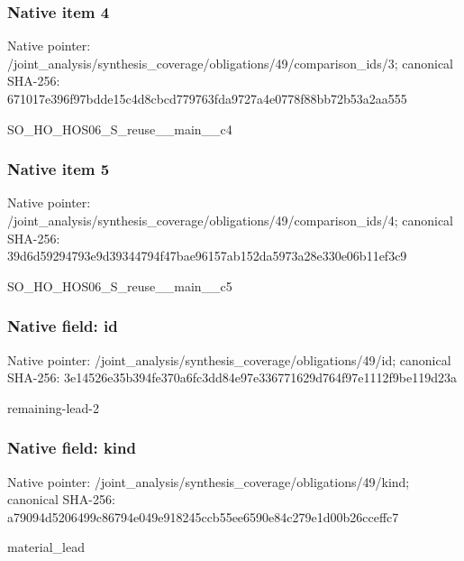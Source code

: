 \documentclass[10pt,a4paper]{article}
\begin{document}
\subsubsection{Native item 4}
Native pointer: /joint\_\allowbreak{}analysis/synthesis\_\allowbreak{}coverage/obligations/49/comparison\_\allowbreak{}ids/3; canonical SHA-256: 671017e396f97bdde15c4d8cbcd779763fda9727a4e0778f88bb72b53a2aa555

\begingroup\raggedright\sloppy SO\_\allowbreak{}HO\_\allowbreak{}HOS06\_\allowbreak{}S\_\allowbreak{}reuse\_\allowbreak{}\_\allowbreak{}main\_\allowbreak{}\_\allowbreak{}c4\par\endgroup

\subsubsection{Native item 5}
Native pointer: /joint\_\allowbreak{}analysis/synthesis\_\allowbreak{}coverage/obligations/49/comparison\_\allowbreak{}ids/4; canonical SHA-256: 39d6d59294793e9d39344794f47bae96157ab152da5973a28e330e06b11ef3c9

\begingroup\raggedright\sloppy SO\_\allowbreak{}HO\_\allowbreak{}HOS06\_\allowbreak{}S\_\allowbreak{}reuse\_\allowbreak{}\_\allowbreak{}main\_\allowbreak{}\_\allowbreak{}c5\par\endgroup

\subsubsection{Native field: id}
Native pointer: /joint\_\allowbreak{}analysis/synthesis\_\allowbreak{}coverage/obligations/49/id; canonical SHA-256: 3e14526e35b394fe370a6fc3dd84e97e336771629d764f97e1112f9be119d23a

\begingroup\raggedright\sloppy remaining-lead-2\par\endgroup

\subsubsection{Native field: kind}
Native pointer: /joint\_\allowbreak{}analysis/synthesis\_\allowbreak{}coverage/obligations/49/kind; canonical SHA-256: a79094d5206499c86794e049e918245ccb55ee6590e84c279e1d00b26cceffc7

\begingroup\raggedright\sloppy material\_\allowbreak{}lead\par\endgroup
\end{document}
